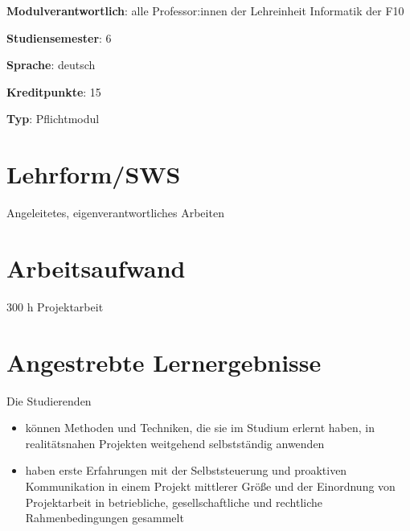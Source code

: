 \begin{modulHead}
\textbf{Modulverantwortlich}: alle Professor:innen
der Lehreinheit Informatik der
F10
\end{modulHead}
\begin{modulHead}
\textbf{Studiensemester}:
6
\end{modulHead}
\begin{modulHead}
\textbf{Sprache}:
deutsch
\end{modulHead}
\begin{modulHead}
\textbf{Kreditpunkte}:
15
\end{modulHead}
\begin{modulHead}
\textbf{Typ}:
Pflichtmodul
\end{modulHead}


\hypertarget{lehrformswspathlabelmi-2017modulbeschreibungen-bachelorba_praxisprojekt}{%
\section*{Lehrform/SWS\label{/mi-2017/modulbeschreibungen-bachelor/BA_Praxisprojekt}}\label{lehrformswspathlabelmi-2017modulbeschreibungen-bachelorba_praxisprojekt}}

Angeleitetes, eigenverantwortliches Arbeiten

\hypertarget{arbeitsaufwandpathlabelmi-2017modulbeschreibungen-bachelorba_praxisprojekt}{%
\section*{Arbeitsaufwand\label{/mi-2017/modulbeschreibungen-bachelor/BA_Praxisprojekt}}\label{arbeitsaufwandpathlabelmi-2017modulbeschreibungen-bachelorba_praxisprojekt}}

300 h Projektarbeit

\hypertarget{angestrebte-lernergebnissepathlabelmi-2017modulbeschreibungen-bachelorba_praxisprojekt}{%
\section*{Angestrebte
Lernergebnisse\label{/mi-2017/modulbeschreibungen-bachelor/BA_Praxisprojekt}}\label{angestrebte-lernergebnissepathlabelmi-2017modulbeschreibungen-bachelorba_praxisprojekt}}

Die Studierenden

\begin{itemize}
\tightlist
\item
  können Methoden und Techniken, die sie im Studium erlernt haben, in
  realitätsnahen Projekten weitgehend selbstständig anwenden
\item
  haben erste Erfahrungen mit der Selbststeuerung und proaktiven
  Kommunikation in einem Projekt mittlerer Größe und der Einordnung von
  Projektarbeit in betriebliche, gesellschaftliche und rechtliche
  Rahmenbedingungen gesammelt
\end{itemize}

